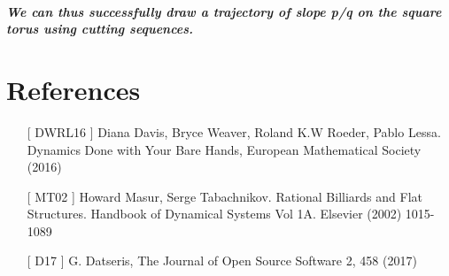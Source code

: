 \documentclass{report}
\begin{document}
\paragraph{We can thus successfully draw a trajectory of slope p/q on the square torus using cutting sequences.}


\chapter*{References}

\begin{enumerate}
\item[[ DWRL16]] Diana Davis, Bryce Weaver, Roland K.W Roeder, Pablo Lessa. Dynamics Done with Your Bare Hands, European Mathematical Society (2016)

\item[[ MT02]] Howard Masur, Serge Tabachnikov. Rational Billiards and Flat Structures. Handbook of Dynamical Systems Vol 1A. Elsevier (2002) 1015-1089

\item[[ D17]] G. Datseris, The Journal of Open Source Software 2, 458 (2017)

\end{enumerate}
\end{document}
